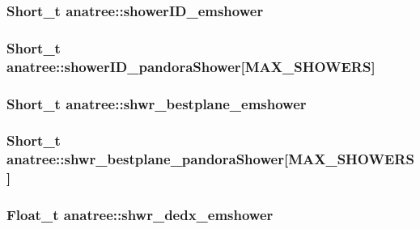 \hypertarget{classanatree_a35b20eca4b3c6b9309254a99199aa916}{
\subsubsection[{shower\-I\-D\-\_\-emshower}]{\setlength{\rightskip}{0pt plus 5cm}Short\-\_\-t anatree\-::shower\-I\-D\-\_\-emshower}}\label{classanatree_a35b20eca4b3c6b9309254a99199aa916}
\hypertarget{classanatree_af27c22dad9e06954d08d5209d69ef9ff}{
\subsubsection[{shower\-I\-D\-\_\-pandora\-Shower}]{\setlength{\rightskip}{0pt plus 5cm}Short\-\_\-t anatree\-::shower\-I\-D\-\_\-pandora\-Shower\mbox{[}{\bf M\-A\-X\-\_\-\-S\-H\-O\-W\-E\-R\-S}\mbox{]}}}\label{classanatree_af27c22dad9e06954d08d5209d69ef9ff}
\hypertarget{classanatree_a3ba83de19a2215bceb3527513df9e878}{
\subsubsection[{shwr\-\_\-bestplane\-\_\-emshower}]{\setlength{\rightskip}{0pt plus 5cm}Short\-\_\-t anatree\-::shwr\-\_\-bestplane\-\_\-emshower}}\label{classanatree_a3ba83de19a2215bceb3527513df9e878}
\hypertarget{classanatree_a99196947abdb04ecee264cc94ba3f56c}{
\subsubsection[{shwr\-\_\-bestplane\-\_\-pandora\-Shower}]{\setlength{\rightskip}{0pt plus 5cm}Short\-\_\-t anatree\-::shwr\-\_\-bestplane\-\_\-pandora\-Shower\mbox{[}{\bf M\-A\-X\-\_\-\-S\-H\-O\-W\-E\-R\-S}\mbox{]}}}\label{classanatree_a99196947abdb04ecee264cc94ba3f56c}
\hypertarget{classanatree_a5a2edbdec9937f0591074ec227fdc7a3}{
\subsubsection[{shwr\-\_\-dedx\-\_\-emshower}]{\setlength{\rightskip}{0pt plus 5cm}Float\-\_\-t anatree\-::shwr\-\_\-dedx\-\_\-emshower}}\label{classanatree_a5a2edbdec9937f0591074ec227fdc7a3}
